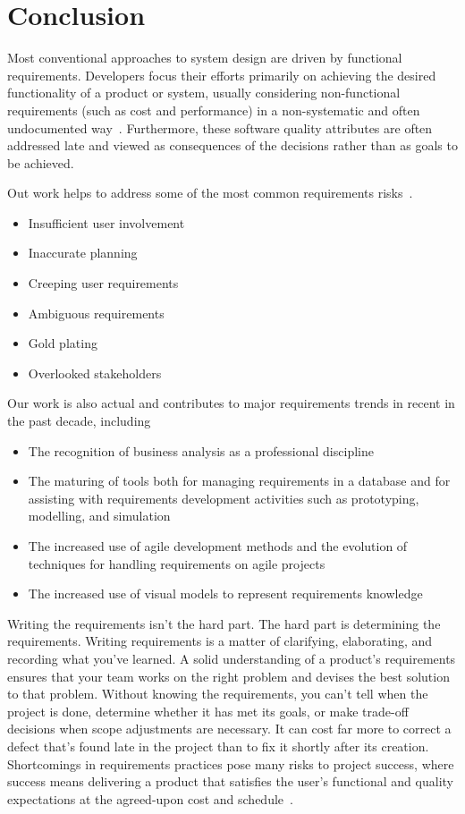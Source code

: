 \documentclass[dissertation,final]{softeng}
\begin{document}
\chapter{Conclusion}
\label{ch:Conclusion}
Most conventional approaches to system design are driven by functional requirements. Developers focus their efforts primarily on achieving the desired functionality of a product or system, usually considering non-functional requirements (such as cost and performance) in a non-systematic and often undocumented way~\citep{Chung2000}. Furthermore, these software quality attributes are often addressed late and viewed as consequences of the decisions rather than as goals to be achieved.

Out work helps to address some of the most common requirements risks~\citep[p. 20]{Wiegers2013}.
\begin{itemize}
\item Insufficient user involvement
\item Inaccurate planning
\item Creeping user requirements
\item Ambiguous requirements
\item Gold plating
\item Overlooked stakeholders
\end{itemize}
\appendix
Our work is also actual and contributes to major requirements trends in recent in the past decade, including
\begin{itemize}
\item The recognition of business analysis as a professional discipline
\item The maturing of tools both for managing requirements in a database and for assisting with requirements development activities such as prototyping, modelling, and simulation
\item The increased use of agile development methods and the evolution of techniques for handling requirements on agile projects
\item The increased use of visual models to represent requirements knowledge
\end{itemize}

Writing the requirements isn't the hard part. The hard part is determining the requirements. Writing requirements is a matter of clarifying, elaborating, and recording what you've learned. A solid understanding of a product's requirements ensures that your team works on the right problem and devises the best solution to that problem. Without knowing the requirements, you can't tell when the project is done, determine whether it has met its goals, or make trade-off decisions when scope adjustments are necessary. It can cost far more to correct a defect that's found late in the project than to fix it shortly after its creation. Shortcomings in requirements practices pose many risks to project success, where success means delivering a product that satisfies the user's functional and quality expectations at the agreed-upon cost and schedule~\citep{Wiegers2013}.
\end{document}
